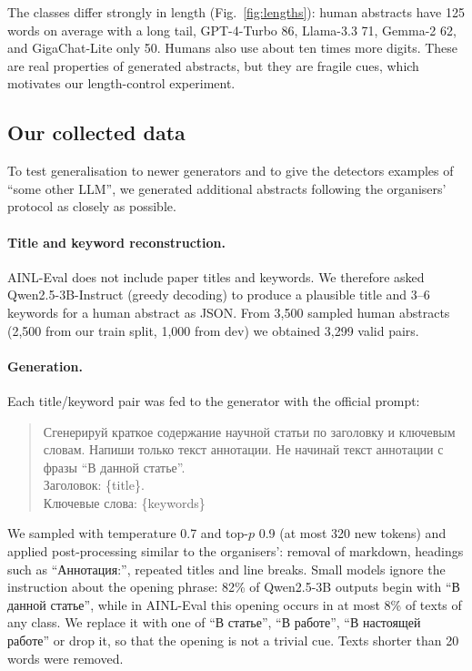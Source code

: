 \documentclass{article}
\begin{document}
The classes differ strongly in length (Fig.~\ref{fig:lengths}): human abstracts have 125 words on average with a long tail, GPT-4-Turbo 86, Llama-3.3 71, Gemma-2 62, and GigaChat-Lite only 50. Humans also use about ten times more digits. These are real properties of generated abstracts, but they are fragile cues, which motivates our length-control experiment.

\subsection{Our collected data}
\label{sec:our_data}
To test generalisation to newer generators and to give the detectors examples of ``some other LLM'', we generated additional abstracts following the organisers' protocol as closely as possible.

\paragraph{Title and keyword reconstruction.} AINL-Eval does not include paper titles and keywords. We therefore asked Qwen2.5-3B-Instruct (greedy decoding) to produce a plausible title and 3--6 keywords for a human abstract as JSON. From 3{,}500 sampled human abstracts (2{,}500 from our train split, 1{,}000 from dev) we obtained 3{,}299 valid pairs.

\paragraph{Generation.} Each title/keyword pair was fed to the generator with the official prompt:
\begin{quote}\small
Сгенерируй краткое содержание научной статьи по заголовку и ключевым словам. Напиши только текст аннотации. Не начинай текст аннотации с фразы ``В данной статье''.\\
Заголовок: \{title\}.\\
Ключевые слова: \{keywords\}
\end{quote}
We sampled with temperature 0.7 and top-$p$ 0.9 (at most 320 new tokens) and applied post-processing similar to the organisers': removal of markdown, headings such as ``Аннотация:'', repeated titles and line breaks. Small models ignore the instruction about the opening phrase: 82\% of Qwen2.5-3B outputs begin with ``В данной статье'', while in AINL-Eval this opening occurs in at most 8\% of texts of any class. We replace it with one of ``В статье'', ``В работе'', ``В настоящей работе'' or drop it, so that the opening is not a trivial cue. Texts shorter than 20 words were removed.
\end{document}
